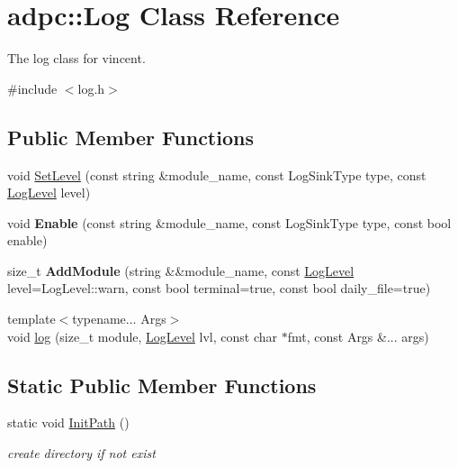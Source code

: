 \hypertarget{classadpc_1_1Log}{}\section{adpc\+:\+:Log Class Reference}
\label{classadpc_1_1Log}


The log class for vincent.  




{\ttfamily \#include $<$log.\+h$>$}

\subsection*{Public Member Functions}
\begin{DoxyCompactItemize}
\item 
void \hyperlink{classadpc_1_1Log_a2e8bf1e2c8ac8381be9022df60530f87}{Set\+Level} (const string \&module\+\_\+name, const Log\+Sink\+Type type, const \hyperlink{log__config_8h_a172986fa5f658c5fe0b42bd954e9e133}{Log\+Level} level)
\item 
\mbox{\label{classadpc_1_1Log_ae9c832f1a8d5f684308f5ef95d53cf36}} 
void {\bfseries Enable} (const string \&module\+\_\+name, const Log\+Sink\+Type type, const bool enable)
\item 
\mbox{\label{classadpc_1_1Log_aed7af8c9b314244e45a7e359cf0a4c82}} 
size\+\_\+t {\bfseries Add\+Module} (string \&\&module\+\_\+name, const \hyperlink{log__config_8h_a172986fa5f658c5fe0b42bd954e9e133}{Log\+Level} level=Log\+Level\+::warn, const bool terminal=true, const bool daily\+\_\+file=true)
\end{DoxyCompactItemize}
\textbf{ }\par
\begin{DoxyCompactItemize}
\item 
{\footnotesize template$<$typename... Args$>$ }\\void \hyperlink{classadpc_1_1Log_a52882c51a9e3abd940164ded9a99b897}{log} (size\+\_\+t module, \hyperlink{log__config_8h_a172986fa5f658c5fe0b42bd954e9e133}{Log\+Level} lvl, const char $\ast$fmt, const Args \&... args)
\end{DoxyCompactItemize}

\subsection*{Static Public Member Functions}
\begin{DoxyCompactItemize}
\item 
static void \hyperlink{classadpc_1_1Log_a41b80ba97a00d128777d22f369bc791f}{Init\+Path} ()
\begin{DoxyCompactList}\small\item\em create directory if not exist \end{DoxyCompactList}\end{DoxyCompactItemize}
